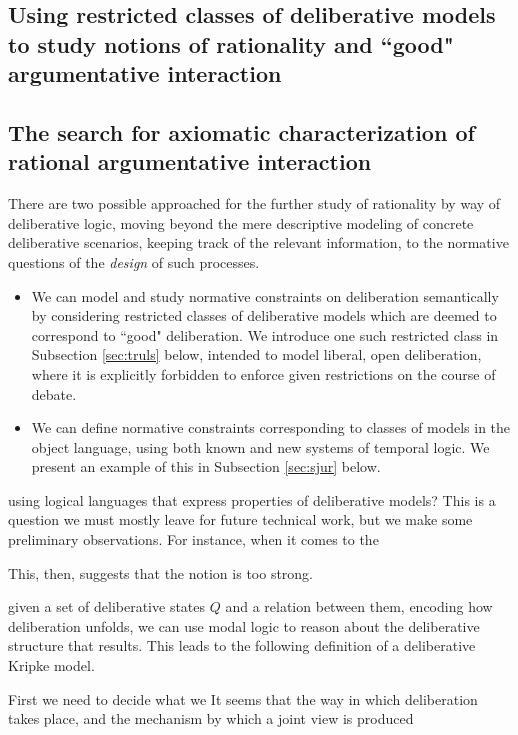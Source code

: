 \documentclass[greybox]{svmult}
\begin{document}
\subsection{Using restricted classes of deliberative models to study notions of rationality and ``good" argumentative interaction}

\subsection{The search for axiomatic characterization of rational argumentative interaction}

 
There are two possible approached for the further study of rationality by way of deliberative logic, moving beyond the mere descriptive modeling of concrete deliberative scenarios, keeping track of the relevant information, to the normative questions of the \emph{design} of such processes.

\begin{itemize}
\item We can model and study normative constraints on deliberation semantically by considering restricted classes of deliberative models which are deemed to correspond to ``good" deliberation. We introduce one such restricted class in Subsection \ref{sec:truls} below, intended to model liberal, open deliberation, where it is explicitly forbidden to enforce given restrictions on the course of debate. 
\item We can define normative constraints corresponding to classes of models in the object language, using both known and new systems of temporal logic. We present an example of this in Subsection \ref{sec:sjur} below.
\end{itemize}



using logical languages that express properties of deliberative models? This is a question we must mostly leave for future technical work, but we make some preliminary observations. For instance, when it comes to the 

This, then, suggests that the notion is too strong. 


given a set of deliberative states $Q$ and a relation between them, encoding how deliberation unfolds, we can use modal logic to reason about the deliberative structure that results. This leads to the following definition of a deliberative Kripke model.



First we need to decide what we 
 It seems that the way in which deliberation takes place, and the mechanism by which a joint view is produced
\end{document}
